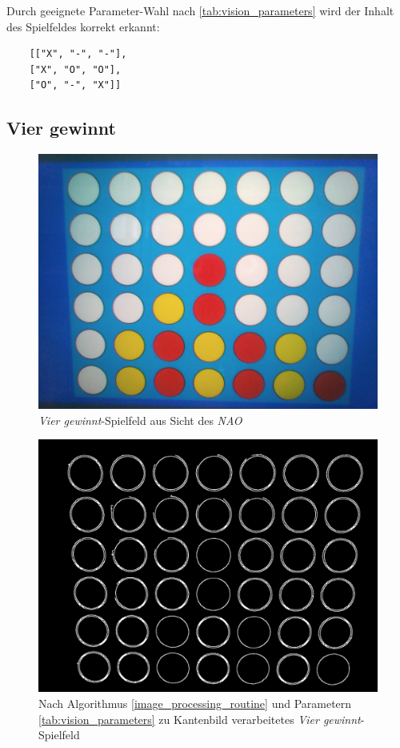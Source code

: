 Durch geeignete Parameter-Wahl nach \vref{tab:vision_parameters} wird der Inhalt des Spielfeldes korrekt erkannt:\\

\begin{verbatim}
    [["X", "-", "-"], 
    ["X", "O", "O"], 
    ["O", "-", "X"]]
\end{verbatim}

\newpage

\subsection{Vier gewinnt}

\begin{figure}[!htbp]
    \centering
    \includegraphics[width=12cm]{bilder/connect4_raw.png}
    \caption{\textit{Vier gewinnt}-Spielfeld aus Sicht des \textit{NAO}}
    \label{fig:connect4_raw}
\end{figure}

\begin{figure}[!htbp]
    \centering
    \includegraphics[width=12cm]{bilder/connect4_edges.png}
    \caption[\textit{Vier gewinnt} Kantenbild]{Nach Algorithmus \vref{image_processing_routine} und Parametern \ref{tab:vision_parameters} zu Kantenbild verarbeitetes \textit{Vier gewinnt}-Spielfeld}
    \label{fig:connect4_edges}
\end{figure}

